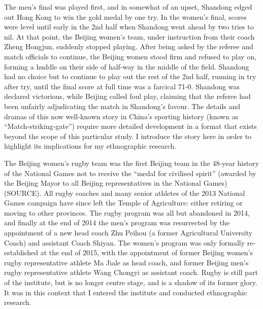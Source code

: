 {The men's final was played first, and in somewhat of an upset, Shandong edged out Hong Kong to win the gold medal by one try.  In the women's final, scores were level until early in the 2nd half when Shandong went ahead by two tries to nil.  At that point, the Beijing women's team, under instruction from their coach Zheng Hongjun, suddenly stopped playing.  After being asked by the referee and match officials to continue, the Beijing women stood firm and refused to play on, forming a huddle on their side of half-way in the middle of the field. Shandong had no choice but to continue to play out the rest of the 2nd half, running in try after try, until the final score at full time was a farcical 71-0.  Shandong was declared victorious, while Beijing called foul play, claiming that the referee had been unfairly adjudicating the match in Shandong's favour.  The details and dramas of this now well-known story in China's sporting history (known as ``Match-striking-gate'') require more detailed development in a format that exists beyond the scope of this particular study. I introduce the story here in order to highlight its implications for my ethnographic research.

The Beijing women's rugby team was the first Beijing team in the 48-year history of the National Games not to receive the ``medal for civilised spirit''  (awarded by the Beijing Mayor to all Beijing representatives in the National Games) (SOURCE).  All rugby coaches and many senior athletes of the 2013 National Games campaign have since left the Temple of Agriculture: either retiring or moving to other provinces.  The rugby program was all but abandoned in 2014, and finally at the end of 2014 the men's program was resurrected by the appointment of a new head coach Zhu Peihou (a former Agricultural University Coach) and assistant Coach Shiyan.  The women's program was only formally re-established at the end of 2015, with the appointment of former Beijing women's rugby representative athlete Ma Jiale as head coach, and former Beijing men's rugby representative athlete Wang Chongyi as assistant coach.  Rugby is still part of the institute, but is no longer centre stage, and is a shadow of its former glory.  It was in this context that I entered the institute and conducted ethnographic research.

}
